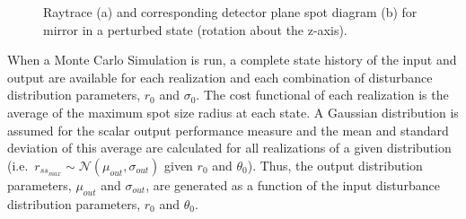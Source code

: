 \begin{figure}	%
 \centering
 \caption{Raytrace (a) and corresponding detector plane spot diagram (b) for mirror in a perturbed state (rotation about the z-axis).}
 \label{rtsd}
\end{figure}
 
 When a Monte Carlo Simulation is run, a complete state history of the input and output are available for each realization and each combination of disturbance distribution parameters, $r_0$ and $\sigma_0$. The cost functional of each realization is the average of the maximum spot size radius at each state. A Gaussian distribution is assumed for the scalar output performance measure and the mean and standard deviation of this average are calculated for all realizations of a given distribution (i.e.\ $r_{ss_{max}} \sim \mathcal{N}\left(\mu_{out},\sigma_{out}\right)$ given $r_0$ and $\theta_0$). Thus, the output distribution parameters, $\mu_{out}$ and $\sigma_{out}$, are generated as a function of the input disturbance distribution parameters, $r_0$ and $\theta_0$.\\
 
